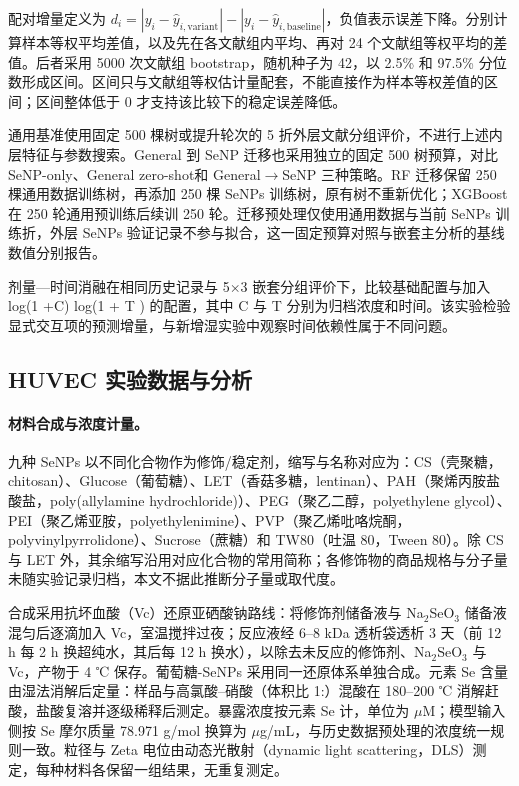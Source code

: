\documentclass[letterpaper]{article}
\begin{document}
配对增量定义为 $d_i=|y_i-\hat y_{i,\mathrm{variant}}|-|y_i-\hat y_{i,\mathrm{baseline}}|$，负值表示误差下降。分别计算样本等权平均差值，以及先在各文献组内平均、再对 24 个文献组等权平均的差值。后者采用 5000 次文献组 bootstrap，随机种子为 42，以 2.5\% 和 97.5\% 分位数形成区间。区间只与文献组等权估计量配套，不能直接作为样本等权差值的区间；区间整体低于 0 才支持该比较下的稳定误差降低。

通用基准使用固定 500 棵树或提升轮次的 5 折外层文献分组评价，不进行上述内层特征与参数搜索。General 到 SeNP 迁移也采用独立的固定 500 树预算，对比 SeNP-only、General zero-shot和 General\ensuremath{\rightarrow}SeNP 三种策略。RF 迁移保留 250 棵通用数据训练树，再添加 250 棵 SeNPs 训练树，原有树不重新优化；XGBoost 在 250 轮通用预训练后续训 250 轮。迁移预处理仅使用通用数据与当前 SeNPs 训练折，外层 SeNPs 验证记录不参与拟合，这一固定预算对照与嵌套主分析的基线数值分别报告。

剂量—时间消融在相同历史记录与 5\ensuremath{\times}3 嵌套分组评价下，比较基础配置与加入 log(1 +C) log(1 + T ) 的配置，其中 C 与 T 分别为归档浓度和时间。该实验检验显式交互项的预测增量，与新增湿实验中观察时间依赖性属于不同问题。

\subsection{HUVEC 实验数据与分析}

\paragraph{材料合成与浓度计量。}
九种 SeNPs 以不同化合物作为修饰/稳定剂，缩写与名称对应为：CS（壳聚糖，chitosan）、Glucose（葡萄糖）、LET（香菇多糖，lentinan）、PAH（聚烯丙胺盐酸盐，poly(allylamine hydrochloride)）、PEG（聚乙二醇，polyethylene glycol）、PEI（聚乙烯亚胺，polyethylenimine）、PVP（聚乙烯吡咯烷酮，polyvinylpyrrolidone）、Sucrose（蔗糖）和 TW80（吐温 80，Tween 80）。除 CS 与 LET 外，其余缩写沿用对应化合物的常用简称；各修饰物的商品规格与分子量未随实验记录归档，本文不据此推断分子量或取代度。

合成采用抗坏血酸（Vc）还原亚硒酸钠路线：将修饰剂储备液与 Na$_2$SeO$_3$ 储备液混匀后逐滴加入 Vc，室温搅拌过夜；反应液经 6--8 kDa 透析袋透析 3 天（前 12 h 每 2 h 换超纯水，其后每 12 h 换水），以除去未反应的修饰剂、Na$_2$SeO$_3$ 与 Vc，产物于 4 ℃ 保存。葡萄糖-SeNPs 采用同一还原体系单独合成。元素 Se 含量由湿法消解后定量：样品与高氯酸--硝酸（体积比 1\!:）混酸在 180--200 ℃ 消解赶酸，盐酸复溶并逐级稀释后测定。暴露浓度按元素 Se 计，单位为 $\mu$M；模型输入侧按 Se 摩尔质量 78.971 g/mol 换算为 $\mu$g/mL，与历史数据预处理的浓度统一规则一致。粒径与 Zeta 电位由动态光散射（dynamic light scattering，DLS）测定，每种材料各保留一组结果，无重复测定。
\end{document}
